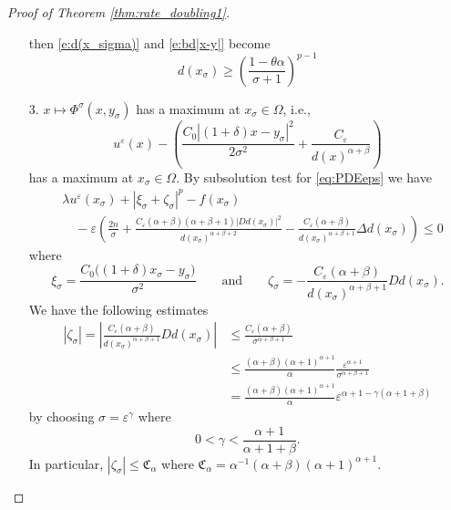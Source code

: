 \documentclass[11pt,reqno]{amsart}
\numberwithin{figure}{section}
\theoremstyle{plain}
\theoremstyle{remark}
\numberwithin{equation}{section}
\begin{document}
\begin{proof}[Proof of Theorem \ref{thm:rate_doubling1}]
\begin{enumerate}
\begin{equation}
    \end{equation}
    then \eqref{e:d(x_sigma)} and \eqref{e:bd|x-y|} become
    \begin{equation}
        d(x_\sigma) \geq \left(\frac{1-\theta\alpha}{\sigma+1}\right)^{p-1}
    \end{equation}
    \item[3.] $x\mapsto \Phi^\sigma(x,y_\sigma)$ has a maximum at $x_\sigma\in \Omega$, i.e.,
    \begin{equation*}
        u^\varepsilon(x) - \left(\frac{C_0|(1+\delta)x-y_\sigma|^2}{2\sigma^2} + \frac{C_\varepsilon}{d(x)^{\alpha+\beta}}\right)
    \end{equation*}
    has a maximum at $x_\sigma\in \Omega$. By subsolution test for \eqref{eq:PDEeps} we have
\begin{align}\label{e:sub1}
    &\lambda u^\varepsilon(x_\sigma) + \left|\xi_\sigma+\zeta_\sigma\right|^p - f(x_\sigma)\nonumber\\
    &\quad  -\varepsilon\left(\frac{2n}{\sigma} + \frac{C_\varepsilon(\alpha+\beta)(\alpha+\beta+1)|D d(x_\sigma)|^2}{d(x_\sigma)^{\alpha+\beta+2}}-\frac{C_\varepsilon(\alpha+\beta)}{d(x_\sigma)^{\alpha+\beta+1}}\Delta d(x_\sigma)\right)  \leq 0
\end{align}
where 
\begin{equation}\label{e:est_xi_zeta}
    \xi_\sigma = \frac{C_0\big((1+\delta)x_\sigma-y_\sigma\big)}{\sigma^2} \qquad\text{and}\qquad \zeta_\sigma = - \frac{C_\varepsilon(\alpha+\beta)}{d(x_\sigma)^{\alpha+\beta+1}}D d(x_\sigma).
\end{equation}
We have the following estimates
\begin{align*}
    |\zeta_\sigma|=\left|\frac{C_\varepsilon(\alpha+\beta)}{d(x_\sigma)^{\alpha+\beta+1}}D d(x_\sigma )\right|
    &\leq \frac{C_\varepsilon(\alpha+\beta)}{\sigma^{\alpha+\beta+1}} \\
    &\leq \frac{(\alpha+\beta)(\alpha+1)^{\alpha+1}}{\alpha} \frac{\varepsilon^{\alpha+1}}{\sigma^{\alpha+\beta+1}} \\
    &= \frac{(\alpha+\beta)(\alpha+1)^{\alpha+1}}{\alpha}\varepsilon^{\alpha+1 - \gamma(\alpha+1+\beta)}
\end{align*}
by choosing $\sigma = \varepsilon^\gamma$ where
\begin{equation*}
 \displaystyle 0 < \gamma < \frac{\alpha+1}{\alpha+1+\beta}.
\end{equation*}
In particular, $|\zeta_\sigma|\leq \mathfrak{C}_\alpha$ where $\mathfrak{C}_\alpha = \alpha^{-1}(\alpha+\beta)(\alpha+1)^{\alpha+1}$. 


\end{enumerate}
\end{proof}
\end{document}
